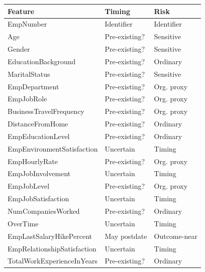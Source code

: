 \documentclass[
  a4paper,
  review]{elsarticle}
\newcounter{none} %
\begin{document}
{\def\LTcaptype{none} %
\begingroup\scriptsize
\begin{longtable}[]{@{}
  >{\raggedright\arraybackslash}p{}
  >{\raggedright\arraybackslash}p{}
  >{\raggedright\arraybackslash}p{}@{}}
\toprule\noalign{}
\begin{minipage}[b]{\linewidth}\raggedright
Feature
\end{minipage} & \begin{minipage}[b]{\linewidth}\raggedright
Timing
\end{minipage} & \begin{minipage}[b]{\linewidth}\raggedright
Risk
\end{minipage} \\
\midrule\noalign{}
\endhead
\bottomrule\noalign{}
\endlastfoot
EmpNumber & Identifier & Identifier \\
Age & Pre-existing? & Sensitive \\
Gender & Pre-existing? & Sensitive \\
EducationBackground & Pre-existing? & Ordinary \\
MaritalStatus & Pre-existing? & Sensitive \\
EmpDepartment & Pre-existing? & Org. proxy \\
EmpJobRole & Pre-existing? & Org. proxy \\
BusinessTravelFrequency & Pre-existing? & Org. proxy \\
DistanceFromHome & Pre-existing? & Ordinary \\
EmpEducationLevel & Pre-existing? & Ordinary \\
EmpEnvironmentSatisfaction & Uncertain & Timing \\
EmpHourlyRate & Pre-existing? & Org. proxy \\
EmpJobInvolvement & Uncertain & Timing \\
EmpJobLevel & Pre-existing? & Org. proxy \\
EmpJobSatisfaction & Uncertain & Timing \\
NumCompaniesWorked & Pre-existing? & Ordinary \\
OverTime & Uncertain & Timing \\
EmpLastSalaryHikePercent & May postdate & Outcome-near \\
EmpRelationshipSatisfaction & Uncertain & Timing \\
TotalWorkExperienceInYears & Pre-existing? & Ordinary \\

\end{longtable}}
\end{document}
